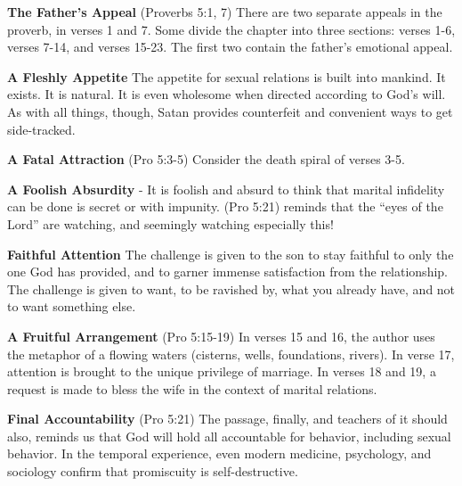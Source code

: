\begin{compactenum}[I.]
    \item \textbf{The Father's Appeal} (Proverbs 5:1, 7) There are two separate appeals in the proverb, in verses 1 and 7.  Some divide the chapter into three sections: verses 1-6, verses 7-14, and verses 15-23. The first two contain the father's emotional appeal.
    \item \textbf{A Fleshly Appetite} The appetite for sexual relations is built into mankind.  It exists.  It is natural. It is even wholesome when directed according to God's will. As with all things, though, Satan provides counterfeit and convenient ways to get side-tracked.
    \item \textbf{A Fatal Attraction} (Pro 5:3-5) Consider the death spiral of verses 3-5.
    \item \textbf{A Foolish Absurdity} - It is foolish and absurd to think that marital infidelity can be done is secret or with impunity. (Pro 5:21) reminds that the ``eyes of the Lord'' are watching, and seemingly watching especially this!
    \item \textbf{Faithful Attention} The challenge is given to the son to stay faithful to only the one God has provided, and to garner immense satisfaction from the relationship. The challenge is given to want, to be ravished by, what you already have, and not to want something else.
    \item \textbf{A Fruitful Arrangement} (Pro 5:15-19) In verses 15 and 16, the author uses the metaphor of a flowing waters (cisterns, wells, foundations, rivers). In verse 17, attention is brought to the unique privilege of marriage. In verses 18 and 19, a request is made to bless the wife in the context of marital relations.
    \item \textbf{Final Accountability} (Pro 5:21) The passage, finally, and teachers of it should also, reminds us that God will hold all accountable for behavior, including sexual behavior. In the temporal experience, even modern   medicine, psychology, and sociology confirm that promiscuity is self-destructive.
\end{compactenum}


